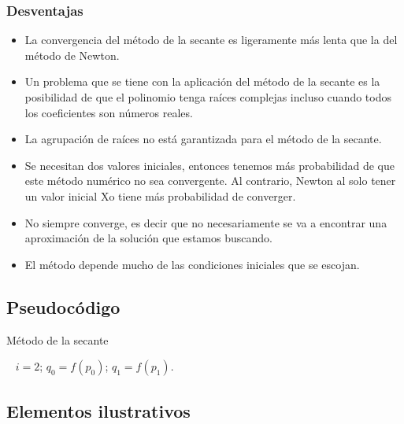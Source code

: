 \subsubsection{Desventajas}

\begin{itemize}
  \item La convergencia del método de la secante es ligeramente más lenta que la del método de Newton. 
  \item Un problema que se tiene con la aplicación del método de la secante es la posibilidad de que el polinomio tenga raíces complejas incluso cuando todos los coeficientes son números reales. 
  \item La agrupación de raíces no está garantizada para el método de la secante.
  \item Se necesitan dos valores iniciales, entonces tenemos más probabilidad de que este método numérico no sea convergente. Al contrario, Newton al solo tener un valor inicial Xo tiene más probabilidad de converger.
  \item No siempre converge, es decir que no necesariamente se va a encontrar una aproximación de la solución que estamos buscando.
  \item El método depende mucho de las condiciones iniciales que se escojan.
\end{itemize}

\subsection{Pseudocódigo}

\begin{algorithm}
    
    \caption{Método de la secante} 
    \
    $i = 2$; 
    \BlankLine
    $q_0 = f(p_0)$; 
    \BlankLine
    $q_1 = f(p_1)$.
    \BlankLine
    \Return {}
    \end{algorithm}

\subsection{Elementos ilustrativos}

